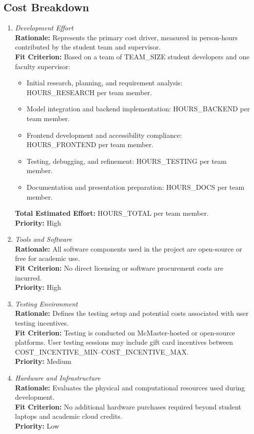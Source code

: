 \documentclass[12pt]{article}
\begin{document}
\subsection{Cost Breakdown}
\begin{enumerate}[label=C-CB \arabic*., wide=0pt, leftmargin=*]
\item \emph{Development Effort}\\[2mm] 
    {\bf Rationale:} Represents the primary cost driver, measured in person-hours contributed by the student team and supervisor.\\
    {\bf Fit Criterion:} Based on a team of TEAM\_SIZE student developers and one faculty supervisor:
    \begin{itemize}
        \item Initial research, planning, and requirement analysis: HOURS\_RESEARCH per team member.
        \item Model integration and backend implementation: HOURS\_BACKEND per team member.
        \item Frontend development and accessibility compliance: HOURS\_FRONTEND per team member.
        \item Testing, debugging, and refinement: HOURS\_TESTING per team member.
        \item Documentation and presentation preparation: HOURS\_DOCS per team member.
    \end{itemize}
    {\bf Total Estimated Effort:} HOURS\_TOTAL per team member.\\
    {\bf Priority:} High

\item \emph{Tools and Software}\\[2mm] 
    {\bf Rationale:} All software components used in the project are open-source or free for academic use.\\
    {\bf Fit Criterion:} No direct licensing or software procurement costs are incurred.\\
    {\bf Priority:} High

\item \emph{Testing Environment}\\[2mm] 
    {\bf Rationale:} Defines the testing setup and potential costs associated with user testing incentives.\\
    {\bf Fit Criterion:} Testing is conducted on McMaster-hosted or open-source platforms. User testing sessions may include gift card incentives between COST\_INCENTIVE\_MIN–COST\_INCENTIVE\_MAX.\\
    {\bf Priority:} Medium

\item \emph{Hardware and Infrastructure}\\[2mm] 
    {\bf Rationale:} Evaluates the physical and computational resources used during development.\\
    {\bf Fit Criterion:} No additional hardware purchases required beyond student laptops and academic cloud credits.\\
    {\bf Priority:} Low
\end{enumerate}
\end{document}
